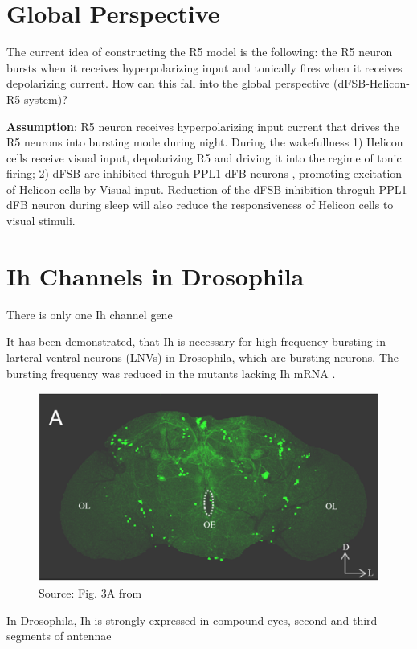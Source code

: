 \documentclass[11pt]{article}
\begin{document}
\section{Global Perspective}

The current idea of constructing the R5 model is the following: the R5 neuron bursts when it
receives hyperpolarizing input and tonically fires when it receives depolarizing current.
How can this fall into the global perspective (dFSB-Helicon-R5 system)?

\textbf{Assumption}: R5 neuron receives hyperpolarizing input current that drives the R5 neurons into
bursting mode during night. During the wakefullness 1) Helicon cells receive visual input, depolarizing
R5 and driving it into the regime of tonic firing; 2) dFSB are inhibited throguh PPL1-dFB neurons
\parencite{liuTwoDopaminergicNeurons2012}, promoting excitation of Helicon cells by Visual input.
Reduction of the dFSB inhibition throguh PPL1-dFB neuron during sleep \parencite{liuTwoDopaminergicNeurons2012}
will also reduce the responsiveness of Helicon cells to visual stimuli.


\section{Ih Channels in Drosophila}

There is only one Ih channel gene \parencite{chenFunctionalStudyHyperpolarization2012,gisselmannVariantsDrosophilaMelanogaster2005}
    
It has been demonstrated, that Ih is necessary for high frequency bursting in
larteral ventral neurons (LNVs) in Drosophila, which are bursting neurons. The bursting
frequency was reduced in the mutants lacking Ih mRNA \parencite{fernandez-chiappeHighFrequencyNeuronalBursting2021}.

\begin{figure}
    \vspace{-1\baselineskip}
    \includegraphics[width=\linewidth]{img/2025_01_15/Ih_expression_drosophila.png}
    \caption{Source: Fig. 3A from \parencite{gonzalo-gomezIhCurrentNecessary2012}}
\end{figure}
In Drosophila, Ih is strongly expressed in compound eyes, second and third segments of antennae \parencite{chenFunctionalStudyHyperpolarization2012}
\end{document}
